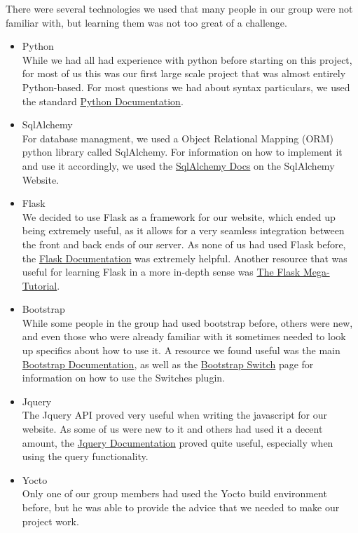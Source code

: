 There were several technologies we used that many people in our group were not familiar with, but learning them was not too great of a challenge.

\begin{itemize}
	\item Python \\
	While we had all had experience with python before starting on this project, for most of us this was our first large scale project that was almost entirely Python-based. For most questions we had about syntax particulars, we used the standard \href{www.docs.python.org}{Python Documentation}.
	\item SqlAlchemy \\
	For database managment, we used a Object Relational Mapping (ORM) python library called SqlAlchemy. For information on how to implement it and use it accordingly, we used the \href{www.docs.sqlalchemy.org}{SqlAlchemy Docs} on the SqlAlchemy Website.
	\item Flask \\
	We decided to use Flask as a framework for our website, which ended up being extremely useful, as it allows for a very seamless integration between the front and back ends of our server. As none of us had used Flask before, the \href{www.flask.pocoo.org\/docs}{Flask Documentation} was extremely helpful. Another resource that was useful for learning Flask in a more in-depth sense was \href{blog.miguelgrinberg.com\/post\/the-flask-mega-tutorial-part-i-hello-world}{The Flask Mega-Tutorial}.
	\item Bootstrap \\
	While some people in the group had used bootstrap before, others were new, and even those who were already familiar with it sometimes needed to look up specifics about how to use it. A resource we found useful was the main \href{www.getbootstrap.com}{Bootstrap Documentation}, as well as the \href{www.bootstrap-switch.org}{Bootstrap Switch} page for information on how to use the Switches plugin.
	\item Jquery \\
	The Jquery API proved very useful when writing the javascript for our website. As some of us were new to it and others had used it a decent amount, the \href{www.api.jquery.com}{Jquery Documentation} proved quite useful, especially when using the query functionality.
	\item Yocto \\
	Only one of our group members had used the Yocto build environment before, but he was able to provide the advice that we needed to make our project work.

\end{itemize}
